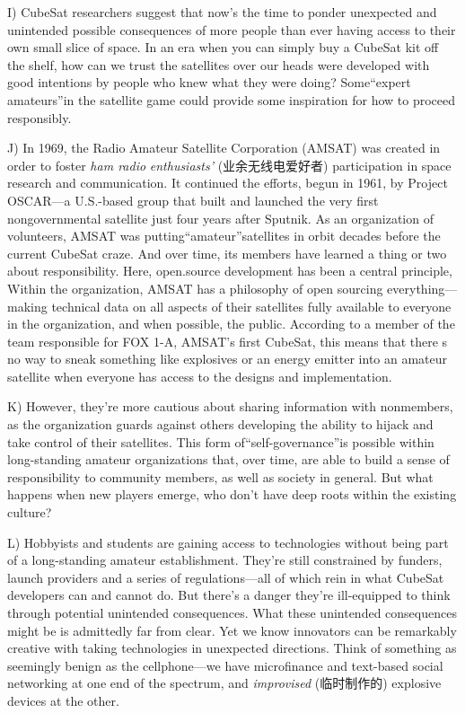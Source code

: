 \documentclass[UTF8,11pt]{ctexart}
\begin{document}
I) CubeSat researchers suggest that now's the time to ponder unexpected and unintended possible consequences of more people than ever having access to their own small slice of space. In an era when you can simply buy a CubeSat kit off the shelf, how can we trust the satellites over our heads were developed with good intentions by people who knew what they were doing? Some“expert amateurs”in the satellite game could provide some inspiration for how to proceed responsibly.


J) In 1969, the Radio Amateur Satellite Corporation (AMSAT) was created in order to foster\textit{ ham radio} \textit{enthusiasts’} (业余无线电爱好者) participation in space research and communication. It continued the efforts, begun in 1961, by Project OSCAR—a U.S.-based group that built and launched the very first nongovernmental satellite just four years after Sputnik. As an organization of volunteers, AMSAT was putting“amateur”satellites in orbit decades before the current CubeSat craze. And over time, its members have learned a thing or two about responsibility. Here, open.source development has been a central principle, Within the organization, AMSAT has a philosophy of open sourcing everything—making technical data on all aspects of their satellites fully available to everyone in the organization, and when possible, the public. According to a member of the team responsible for FOX 1-A, AMSAT's first CubeSat, this means that there s no way to sneak something like explosives or an energy emitter into an amateur satellite when everyone has access to the designs and implementation.


K) However, they're more cautious about sharing information with nonmembers, as the organization guards against others developing the ability to hijack and take control of their satellites. This form of“self-governance”is possible within long-standing amateur organizations that, over time, are able to build a sense of responsibility to community members, as well as society in general. But what happens when new players emerge, who don't have deep roots within the existing culture?


L) Hobbyists and students are gaining access to technologies without being part of a long-standing amateur establishment. They're still constrained by funders, launch providers and a series of regulations—all of which rein in what CubeSat developers can and cannot do. But there's a danger they're ill-equipped to think through potential unintended consequences. What these unintended consequences might be is admittedly far from clear. Yet we know innovators can be remarkably creative with taking technologies in unexpected directions. Think of something as seemingly benign as the cellphone—we have microfinance and text-based social networking at one end of the spectrum, and\textit{ improvised} (临时制作的) explosive devices at the other.
\end{document}
